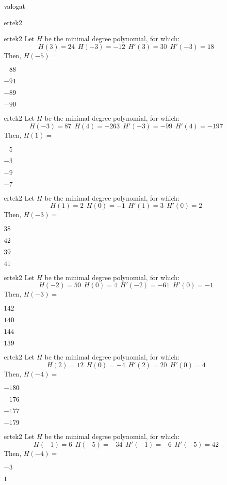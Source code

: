 \documentclass[12pt]{article}
\begin{document}
\begin{quiz}{valogat}
\begin{multi}{ertek2}
\end{multi}\begin{multi}{ertek2}
Let $H$ be the minimal degree polynomial, for which:
$$
H(3)=24\ \ H(-3)=-12 \ \ H'(3)=30 \ \ H'(-3)=18
$$
Then, $H(-5)=$
\item* $ -88 $
\item  $ -91 $
\item  $ -89 $
\item  $ -90 $
\end{multi}\begin{multi}{ertek2}
Let $H$ be the minimal degree polynomial, for which:
$$
H(-3)=87\ \ H(4)=-263 \ \ H'(-3)=-99 \ \ H'(4)=-197
$$
Then, $H(1)=$
\item* $ -5 $
\item  $ -3 $
\item  $ -9 $
\item  $ -7 $
\end{multi}\begin{multi}{ertek2}
Let $H$ be the minimal degree polynomial, for which:
$$
H(1)=2\ \ H(0)=-1 \ \ H'(1)=3 \ \ H'(0)=2
$$
Then, $H(-3)=$
\item* $ 38 $
\item  $ 42 $
\item  $ 39 $
\item  $ 41 $
\end{multi}\begin{multi}{ertek2}
Let $H$ be the minimal degree polynomial, for which:
$$
H(-2)=50\ \ H(0)=4 \ \ H'(-2)=-61 \ \ H'(0)=-1
$$
Then, $H(-3)=$
\item* $ 142 $
\item  $ 140 $
\item  $ 144 $
\item  $ 139 $
\end{multi}\begin{multi}{ertek2}
Let $H$ be the minimal degree polynomial, for which:
$$
H(2)=12\ \ H(0)=-4 \ \ H'(2)=20 \ \ H'(0)=4
$$
Then, $H(-4)=$
\item* $ -180 $
\item  $ -176 $
\item  $ -177 $
\item  $ -179 $
\end{multi}\begin{multi}{ertek2}
Let $H$ be the minimal degree polynomial, for which:
$$
H(-1)=6\ \ H(-5)=-34 \ \ H'(-1)=-6 \ \ H'(-5)=42
$$
Then, $H(-4)=$
\item* $ -3 $
\item  $ 1 $

\end{multi}
\end{quiz}
\end{document}
